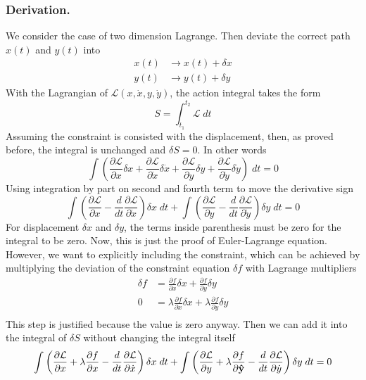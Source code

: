\documentclass[../../../main.tex]{subfiles}
\begin{document}
\subsubsection{Derivation.}
We consider the case of two dimension Lagrange.
Then deviate the correct path $x(t)$ and $y(t)$ into
\begin{align*}
	x(t) & \rightarrow x(t)+\delta x \\
	y(t) & \rightarrow y(t)+\delta y
\end{align*}
With the Lagrangian of $\mathcal{L}(x,\dot{x},y,\dot{y})$, the action integral takes the form
\begin{equation*}
	S=\int_{t_1}^{t_2}\mathcal{L}\;dt
\end{equation*}
Assuming the constraint is consisted with the displacement, then, as proved before, the integral is unchanged and $\delta S=0$. In other words
\begin{equation*}
	\int\left(\frac{\partial \mathcal{L}}{\partial x}\delta x+\frac{\partial\mathcal{L}}{\partial \dot{x}}\delta \dot{x}+\frac{\partial\mathcal{L}}{\partial y}\delta y+\frac{\partial\mathcal{L}}{\partial\dot{y}}\delta \dot{y}\right)\;dt=0
\end{equation*}
Using integration by part on second and fourth term to move the derivative sign
\begin{equation*}
	\int\left(\frac{\partial\mathcal{L}}{\partial x}-\frac{d}{dt}\frac{\partial\mathcal{L}}{\partial \dot{x}}\right)\delta x\;dt+\int \left(\frac{\partial\mathcal{L}}{\partial y}-\frac{d}{dt}\frac{\partial\mathcal{L}}{\partial \dot{y}}\right)\delta y\;dt=0
\end{equation*}
For displacement $\delta x$ and $\delta y$, the terms inside parenthesis must be zero for the integral to be zero.
Now, this is just the proof of Euler-Lagrange equation.
However, we want to explicitly including the constraint, which can be achieved by multiplying the deviation of the constraint equation $\delta f$ with Lagrange multipliers
\begin{align*}
	\delta f & =\frac{\partial f}{\partial x}\delta x +\frac{\partial f}{\partial y}\delta y               \\
	0        & =\lambda\frac{\partial f}{\partial x}\delta x +\lambda\frac{\partial f}{\partial y}\delta y \\
\end{align*}
This step is justified because the value is zero anyway.
Then we can add it into the integral of $\delta S$ without changing the integral itself
\begin{equation*}
	\int\left(\frac{\partial\mathcal{L}}{\partial x}+\lambda\frac{\partial f}{\partial x}-\frac{d}{dt}\frac{\partial\mathcal{L}}{\partial \dot{x}}\right)\delta x\;dt+\int \left(\frac{\partial\mathcal{L}}{\partial y}+\lambda\frac{\partial f}{\partial \mathbf{\hat{y}}}-\frac{d}{dt}\frac{\partial\mathcal{L}}{\partial \dot{y}}\right)\delta y\;dt=	0
\end{equation*}
\end{document}
